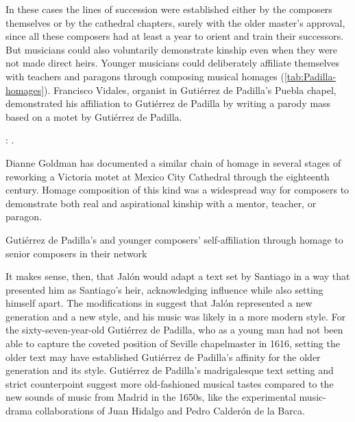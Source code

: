 In these cases the lines of succession were established either by the composers
themselves or by the cathedral chapters, surely with the older master's
approval, since all these composers had at least a year to orient and train
their successors.
But musicians could also voluntarily demonstrate kinship even when they were not
made direct heirs. 
Younger musicians could deliberately affiliate themselves with teachers and
paragons through composing musical homages (\cref{tab:Padilla-homages}).
Francisco Vidales, organist in Gutiérrez de Padilla's Puebla chapel,
demonstrated his affiliation to Gutiérrez de Padilla by writing a parody mass
based on a motet by Gutiérrez de Padilla.%
\begin{Footnote}
    \Autocite{Koegel:Padilla}: .
\end{Footnote}
Dianne Goldman has documented a similar chain of homage in several stages of
reworking a Victoria motet at Mexico City Cathedral through the eighteenth
century.%
    \Autocite{Goldman:StileAntico}
Homage composition of this kind was a widespread way for composers to
demonstrate both real and aspirational kinship with a mentor, teacher, or
paragon.

{Gutiérrez de Padilla's  and younger composers' self-affiliation
through homage to senior composers in their network}

It makes sense, then, that Jalón would adapt a text set by Santiago in a way
that presented him as Santiago's heir, acknowledging influence while also
setting himself apart.
The modifications in  suggest that Jalón
represented a new generation and a new style, and his music was likely in a more
modern style.
For the sixty-seven-year-old Gutiérrez de Padilla, who as a young man had not
been able to capture the coveted position of Seville chapelmaster in 1616,
setting the older text may have established Gutiérrez de Padilla's affinity for
the older generation and its style.  
Gutiérrez de Padilla's madrigalesque text setting and strict counterpoint
suggest more old-fashioned musical tastes compared to the new sounds of music
from Madrid in the 1650s, like the experimental music-drama collaborations of
Juan Hidalgo and Pedro Calderón de la Barca.%
    \Autocite{Stein:Songs}

